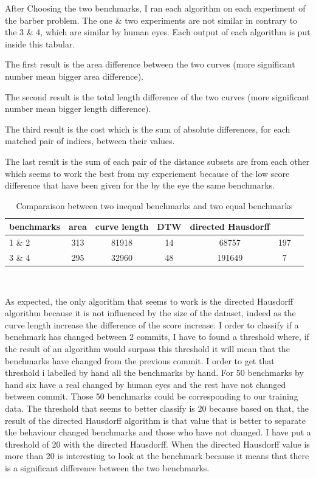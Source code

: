 \documentclass{article}
\begin{document}
After Choosing the two benchmarks, I ran each algorithm on each experiment of the barber problem.
The one \& two experiments are not similar in contrary to the 3 \& 4, which are similar by human eyes.
Each output of each algorithm is put inside this tabular.


The first result is the area difference between the two curves (more significant number mean bigger area difference).

The second result is the total length difference of the two curves (more significant number mean bigger length difference).

The third result is the cost which is the sum of absolute differences, for each matched pair of indices, between their values.

The last result is the sum of each pair of the distance subsets are from each other which seems to work the best from my experiement because of the low score difference that have been given for the by the eye the same benchmarks.

\begin{table}[h!]
\begin{tabular}{|l|c|c|c|c|c|c|}
   \hline
   benchmarks  & area & curve length & DTW & directed Hausdorff \\
   \hline
   1 \&  2 & 313 & 81918 & 14 & 68757 & 197\\
   \hline
   3 \& 4  & 295 & 32960 & 48 & 191649 & 7 \\
   \hline
\end{tabular} \\ 
\caption{Comparaison between two inequal benchmarks and two equal benchmarks}
\label{result}
\end{table}


As expected, the only algorithm that seems to work is the directed Hausdorff algorithm because it is not influenced by the size of the dataset, indeed as the curve length increase the difference of the score increase. 
I order to classify if a benchmark has changed between 2 commits, I have to found a threshold where, if the result of an algorithm would surpass this threshold it will mean that the benchmarks have changed from the previous commit. I order to get that threshold i labelled by hand all the benchmarks by hand. For 50 benchmarks by hand six have a real changed by human eyes and the rest have not changed between commit. Those 50 benchmarks could be corresponding to our training data. The threshold that seems to better classify is 20 because based on that, the result of the directed Hausdorff algorithm is that value that is better to separate the behaviour changed benchmarks and those who have not changed.
I have put a threshold of 20 with the directed Hausdorff. When the directed Hausdorff value is more than 20 is interesting to look at the benchmark because it means that there is a significant difference between the two benchmarks.
\end{document}
